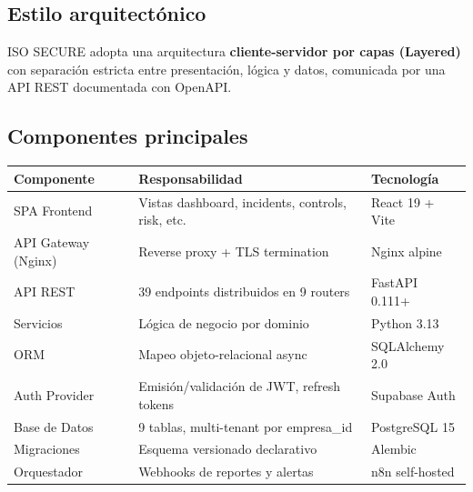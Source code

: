 \documentclass[12pt,a4paper,oneside]{article}
\begin{document}
\subsection{Estilo arquitectónico}

ISO SECURE adopta una arquitectura \textbf{cliente-servidor por capas (Layered)} con separación estricta entre presentación, lógica y datos, comunicada por una API REST documentada con OpenAPI.

\begin{center}
\end{center}

\subsection{Componentes principales}

\begin{table}[h]
\centering
\small
\begin{tabularx}{\textwidth}{lXl}
\toprule
\textbf{Componente} & \textbf{Responsabilidad} & \textbf{Tecnología} \\
\midrule
SPA Frontend & Vistas dashboard, incidents, controls, risk, etc. & React 19 + Vite \\
API Gateway (Nginx) & Reverse proxy + TLS termination & Nginx alpine \\
API REST & 39 endpoints distribuidos en 9 routers & FastAPI 0.111+ \\
Servicios & Lógica de negocio por dominio & Python 3.13 \\
ORM & Mapeo objeto-relacional async & SQLAlchemy 2.0 \\
Auth Provider & Emisión/validación de JWT, refresh tokens & Supabase Auth \\
Base de Datos & 9 tablas, multi-tenant por empresa\_id & PostgreSQL 15 \\
Migraciones & Esquema versionado declarativo & Alembic \\
Orquestador & Webhooks de reportes y alertas & n8n self-hosted \\
\bottomrule
\end{tabularx}
\end{table}
\end{document}
